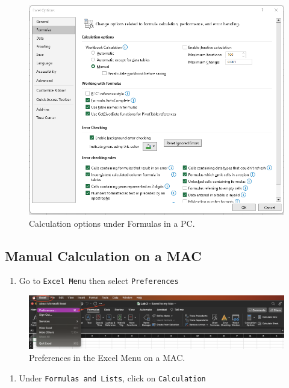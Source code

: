 \documentclass[
]{book}
\providecommand{\tightlist}{%
  \setlength{\itemsep}{0pt}\setlength{\parskip}{0pt}}
\begin{document}
\begin{figure}

{\centering \includegraphics[width=0.8\linewidth]{manualcalc-pc} 

}

\caption{Calculation options under Formulas in a PC.}\label{fig:manualcalc-pc}
\end{figure}

\hypertarget{manual-calculation-on-a-mac}{%
\subsection{Manual Calculation on a MAC}\label{manual-calculation-on-a-mac}}

\begin{enumerate}
\def\labelenumi{\arabic{enumi}.}
\tightlist
\item
  Go to \texttt{Excel\ Menu} then select \texttt{Preferences}
\end{enumerate}

\begin{figure}

{\centering \includegraphics[width=0.9\linewidth]{manual-calculation1} 

}

\caption{Preferences in the Excel Menu on a MAC.}\label{fig:manual-calculation1}
\end{figure}

\begin{enumerate}
\def\labelenumi{\arabic{enumi}.}
\setcounter{enumi}{1}
\tightlist
\item
  Under \texttt{Formulas\ and\ Lists}, click on \texttt{Calculation}
\end{enumerate}
\end{document}
